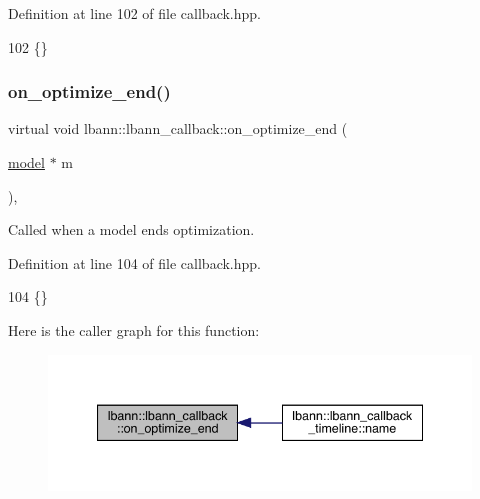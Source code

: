 Definition at line 102 of file callback.\+hpp.


\begin{DoxyCode}
102 \{\}
\end{DoxyCode}
\mbox{\label{classlbann_1_1lbann__callback_a235195d5fa4461835b861a03a5c0278f}} 
\subsubsection{\texorpdfstring{on\+\_\+optimize\+\_\+end()}{on\_optimize\_end()}\hspace{0.1cm}{\footnotesize\ttfamily [1/2]}}
{\footnotesize\ttfamily virtual void lbann\+::lbann\+\_\+callback\+::on\+\_\+optimize\+\_\+end (\begin{DoxyParamCaption}\item[{\hyperlink{classlbann_1_1model}{model} $\ast$}]{m }\end{DoxyParamCaption})\hspace{0.3cm}{\ttfamily [inline]}, {\ttfamily [virtual]}}

Called when a model ends optimization. 

Definition at line 104 of file callback.\+hpp.


\begin{DoxyCode}
104 \{\}
\end{DoxyCode}
Here is the caller graph for this function\+:\nopagebreak
\begin{figure}[H]
\begin{center}
\leavevmode
\includegraphics[width=340pt]{classlbann_1_1lbann__callback_a235195d5fa4461835b861a03a5c0278f_icgraph}
\end{center}
\end{figure}
\mbox{\label{classlbann_1_1lbann__callback_a4653e2903bfd3903709a81eaf7eabc1a}} 
